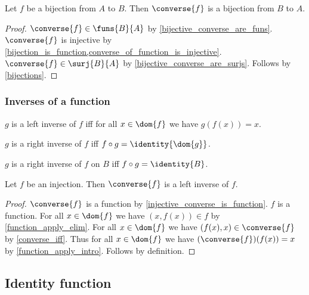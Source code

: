 \begin{proposition}\label{bijection_converse_is_bijection}
    Let $f$ be a bijection from $A$ to $B$.
    Then $\converse{f}$ is a bijection from $B$ to $A$.
\end{proposition}
\begin{proof}
    $\converse{f}\in\funs{B}{A}$ by \cref{bijective_converse_are_funs}.
    $\converse{f}$ is injective by \cref{bijection_is_function,converse_of_function_is_injective}.
    $\converse{f}\in\surj{B}{A}$ by \cref{bijective_converse_are_surjs}.
    Follows by \cref{bijections}.
\end{proof}

\subsubsection{Inverses of a function}

\begin{abbreviation}\label{leftinverse}
    $g$ is a left inverse of $f$ iff for all $x\in\dom{f}$ we have $g(f(x)) = x$.
\end{abbreviation}

\begin{abbreviation}\label{rightinverse}
    $g$ is a right inverse of $f$ iff $f\circ g = \identity{\dom{g}}$.
\end{abbreviation}

\begin{abbreviation}\label{rightinverseon}
    $g$ is a right inverse of $f$ on $B$ iff $f\circ g = \identity{B}$.
\end{abbreviation}

\begin{proposition}\label{injective_converse_is_leftinverse}
    Let $f$ be an injection.
    Then $\converse{f}$ is a left inverse of $f$.
\end{proposition}
\begin{proof}
    $\converse{f}$ is a function by \cref{injective_converse_is_function}.
    $f$ is a function.
    For all $x\in\dom{f}$ we have $(x,f(x))\in f$
        by \cref{function_apply_elim}.
    For all $x\in\dom{f}$ we have $(f(x),x)\in\converse{f}$
        by \cref{converse_iff}.
    Thus for all $x\in\dom{f}$ we have $(\converse{f})(f(x))=x$
        by \cref{function_apply_intro}.
    Follows by definition.
\end{proof}


\subsection{Identity function}

